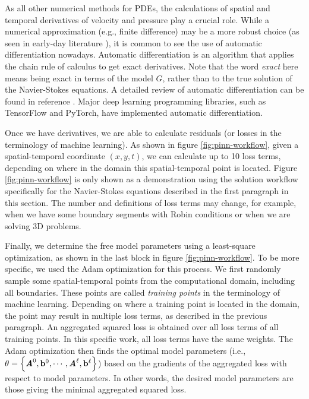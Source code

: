 As all other numerical methods for PDEs, the calculations of spatial and temporal derivatives of velocity and pressure play a crucial role.
While a numerical approximation (e.g., finite difference) may be a more robust choice (as seen in early-day literature \cite{dissanayake_neural-network-based_1994,lagaris_artificial_1998}), it is common to see the use of automatic differentiation nowadays.
Automatic differentiation is an algorithm that applies the chain rule of calculus to get exact derivatives.
Note that the word {\it exact} here means being exact in terms of the model $G$, rather than to the true solution of the Navier-Stokes equations. 
A detailed review of automatic differentiation can be found in reference \cite{griewank_automatic_1988}.
Major deep learning programming libraries, such as TensorFlow and PyTorch, have implemented automatic differentiation.

Once we have derivatives, we are able to calculate residuals (or losses in the terminology of machine learning).
As shown in figure \ref{fig:pinn-workflow}, given a spatial-temporal coordinate $(x, y, t)$, we can calculate up to \num{10} loss terms, depending on where in the domain this spatial-temporal point is located. 
Figure \ref{fig:pinn-workflow} is only shown as a demonstration using the solution workflow specifically for the Navier-Stokes equations described in the first paragraph in this section.
The number and definitions of loss terms may change, for example, when we have some boundary segments with Robin conditions or when we are solving 3D problems.

Finally, we determine the free model parameters using a least-square optimization, as shown in the last block in figure \ref{fig:pinn-workflow}.
To be more specific, we used the Adam optimization for this process. 
We first randomly sample some spatial-temporal points from the computational domain, including all boundaries.
These points are called {\it training points} in the terminology of machine learning.
Depending on where a training point is located in the domain, the point may result in multiple loss terms, as described in the previous paragraph.
An aggregated squared loss is obtained over all loss terms of all training points.
In this specific work, all loss terms have the same weights.
The Adam optimization then finds the optimal model parameters (i.e., $\theta=\left\{\boldsymbol{\mathit{A}}^0, \mathbf{b}^0, \cdots, \boldsymbol{\mathit{A}}^\ell, \mathbf{b}^\ell\right\}$) based on the gradients of the aggregated loss with respect to model parameters.
In other words, the desired model parameters are those giving the minimal aggregated squared loss.

